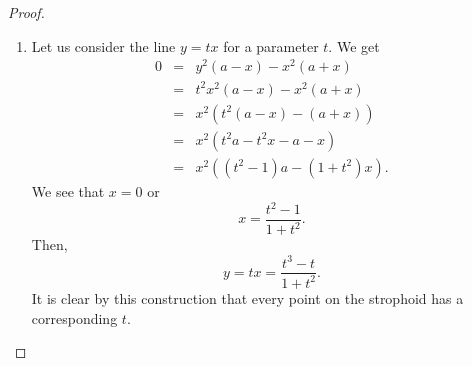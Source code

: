 \begin{proof}
\begin{enumerate}
        \item Let us consider the line $y=tx$ for a parameter $t$. We get
        \begin{eqnarray*}
            0 
            & = & y^2 (a-x) - x^2 (a+x)\\
            & = & t^2 x^2 (a-x) - x^2 (a+x)\\
            & = & x^2 ( t^2(a-x) - (a+x))\\
            & = & x^2 (  t^2 a - t^2 x - a - x)\\
            & = & x^2 (  (t^2 - 1)a - (1+t^2) x).
        \end{eqnarray*}
        We see that $x=0$ or
        $$x = \frac{t^2 - 1}{1 + t^2}.$$
        Then,
        $$y = tx = \frac{t^3 - t}{1 + t^2}.$$
        It is clear by this construction that every point on the strophoid has a corresponding $t$.
    \end{enumerate}
\end{proof}

